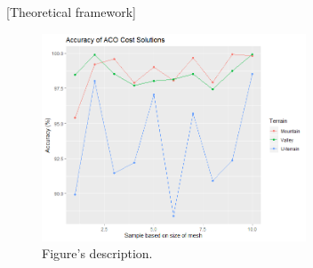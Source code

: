 [Theoretical framework]

\begin{figure}[h]
    \centering
    \includegraphics[width=0.7\textwidth]{images/accuracy_example_fig.png}
    \caption{Figure's description.}
     \label{fig:description}
\end{figure}